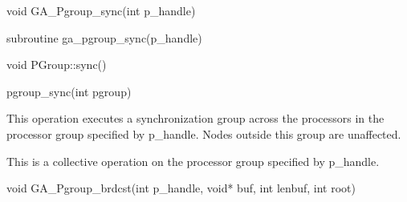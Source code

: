 \documentclass[12pt]{article}
\begin{document}

\begin{capi}
\begin{ccode}
void GA_Pgroup_sync(int p_handle)
\end{ccode}
\begin{funcargs}
\end{funcargs}
\end{capi}

\begin{fapi}
\begin{fcode}
subroutine ga_pgroup_sync(p_handle)
\end{fcode}
\begin{funcargs}
\end{funcargs}
\end{fapi}

\begin{cxxapi}
\begin{cxxcode}
void PGroup::sync()
\end{cxxcode}
\end{cxxapi}

\begin{pyapi}
\begin{pycode}
pgroup_sync(int pgroup) 
\end{pycode}
\end{pyapi} 


\begin{desc}

This operation executes a synchronization group across the processors in the processor group specified by p_handle. Nodes outside this group are unaffected.

This is a collective operation on the processor group specified by p_handle. 
\end{desc}


\begin{capi}
\begin{ccode}
void GA_Pgroup_brdcst(int p_handle, void* buf, int lenbuf, int root)
\end{ccode}
\begin{funcargs}
\end{funcargs}
\end{capi}
\end{document}
